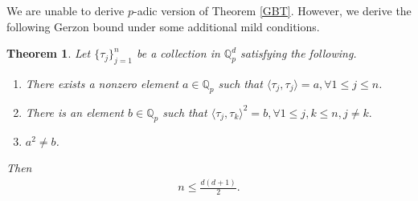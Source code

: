 \documentclass{amsart}
\newtheorem{theorem}{Theorem}[section]
\begin{document}
We are unable to derive $p$-adic version of Theorem \ref{GBT}.  However, we derive the following  Gerzon bound under some additional mild conditions.
\begin{theorem}	\label{PGERZON}
	Let $\{\tau_j\}_{j=1}^n$ be a collection in $\mathbb{Q}^d_p$  satisfying the following.
	\begin{enumerate}[\upshape(i)]
		\item There exists a nonzero element  $a \in \mathbb{Q}_p$ such that  $\langle \tau_j, \tau_j\rangle =a,  \forall 1\leq j \leq n$.
		\item There is an element  $b \in \mathbb{Q}_p$ such that $\langle \tau_j, \tau_k\rangle^2 =b, \forall  1\leq j,k \leq n, j\neq k.$
		\item $a^2\neq b$. 
	\end{enumerate}
	Then 
	\begin{align*}
		n \leq  \frac{d(d+1)}{2}.	
	\end{align*}
\end{theorem}
\end{document}
